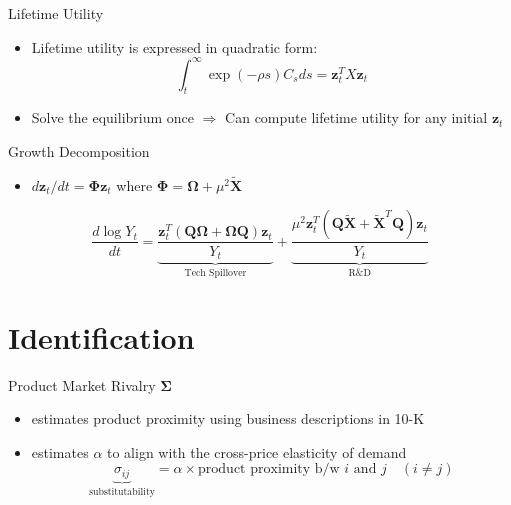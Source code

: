 \documentclass[
  10pt,               %
  aspectratio=169,     %
]{beamer}
\theoremstyle{plain}
\begin{document}
\begin{frame}{Lifetime Utility}

  \label{aggregation}
  \begin{itemize}
    \item Lifetime utility is expressed in quadratic form:
          \[
            \int_{t}^{\infty}\exp\left(-\rho s\right)C_{s}ds=\bm{z}_{t}^{T}X\bm{z}_{t}
          \]

          \hyperlink{X}{}
    \item Solve the equilibrium once $\Longrightarrow$ Can compute lifetime utility for any initial $\bm{z}_{t}$
  \end{itemize}
\end{frame}

\begin{frame}{Growth Decomposition}
  \begin{itemize}
    \item $d\bm{z}_{t}/dt= \bm{\Phi}\bm{z}_{t}$ where $\bm{\Phi}=\bm{\Omega}+\mu^{2}\bm{\widetilde{X}}$
  \end{itemize}
  \begin{equation*}
    \frac{d\log Y_{t}}{dt} = \underbrace{\frac{\bm{z}_{t}^{T}\left(\bm{Q}\bm{\Omega}+\bm{\Omega}\bm{Q}\right)\bm{z}_{t}}{Y_{t}}}_{\text{Tech Spillover}} + \underbrace{\frac{\mu^{2}\bm{z}_{t}^{T}\left(\bm{Q}\bm{\widetilde{X}}+\bm{\widetilde{X}}^{T}\bm{Q}\right)\bm{z}_{t}}{Y_{t}}}_{\text{R\&D}}
  \end{equation*}
\end{frame}

\section{Identification}

\begin{frame}{Product Market Rivalry $\bm{\Sigma}$}

  \begin{itemize}
    \item \label{product_identification} \citet{Hoberg2016-jm} estimates product proximity using business
          descriptions in 10-K
          \medskip{}
    \item \citet{Pellegrino2024-dn} estimates $\alpha$ to align with the cross-price
          elasticity of demand
          \medskip{}
          \[
            \underbrace{\sigma_{ij}}_{\text{substitutability}}=\alpha\times\text{product proximity b/w }i\text{ and }j\quad\left(i\neq j\right)
          \]\hyperlink{micro_vs_ghl}{}
  \end{itemize}
\end{frame}
\end{document}
